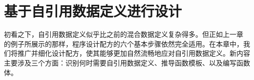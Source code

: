 
\chapter{基于自引用数据定义进行设计}
\label{sec:ch09_designing_lists}

初看之下，自引用数据定义似乎比之前的混合数据定义复杂得多。但正如上一章  的例子所展示的那样，程序设计配方的六个基本步骤依然完全适用。在本章中，我们将推广并细化设计配方，使其能够更加自然流畅地应对自引用数据定义。新内容主要涉及三个方面：识别何时需要自引用数据定义、推导函数模板、以及编写函数体。

